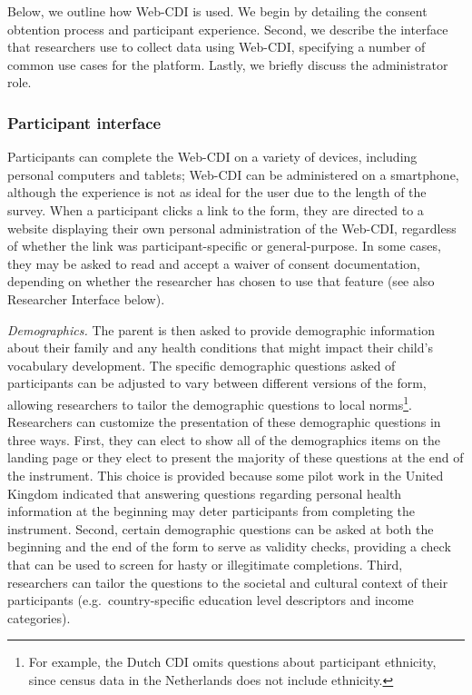 \documentclass[
  english,
  man]{apa7}
\begin{document}
Below, we outline how Web-CDI is used. We begin by detailing the consent obtention process and participant experience. Second, we describe the interface that researchers use to collect data using Web-CDI, specifying a number of common use cases for the platform. Lastly, we briefly discuss the administrator role.

\hypertarget{participant-interface}{%
\subsubsection{Participant interface}\label{participant-interface}}

Participants can complete the Web-CDI on a variety of devices, including personal computers and tablets; Web-CDI can be administered on a smartphone, although the experience is not as ideal for the user due to the length of the survey. When a participant clicks a link to the form, they are directed to a website displaying their own personal administration of the Web-CDI, regardless of whether the link was participant-specific or general-purpose. In some cases, they may be asked to read and accept a waiver of consent documentation, depending on whether the researcher has chosen to use that feature (see also Researcher Interface below).

\emph{Demographics.} The parent is then asked to provide demographic information about their family and any health conditions that might impact their child's vocabulary development. The specific demographic questions asked of participants can be adjusted to vary between different versions of the form, allowing researchers to tailor the demographic questions to local norms\footnote{For example, the Dutch CDI omits questions about participant ethnicity, since census data in the Netherlands does not include ethnicity.}. Researchers can customize the presentation of these demographic questions in three ways. First, they can elect to show all of the demographics items on the landing page or they elect to present the majority of these questions at the end of the instrument. This choice is provided because some pilot work in the United Kingdom indicated that answering questions regarding personal health information at the beginning may deter participants from completing the instrument. Second, certain demographic questions can be asked at both the beginning and the end of the form to serve as validity checks, providing a check that can be used to screen for hasty or illegitimate completions. Third, researchers can tailor the questions to the societal and cultural context of their participants (e.g.~country-specific education level descriptors and income categories).
\end{document}
